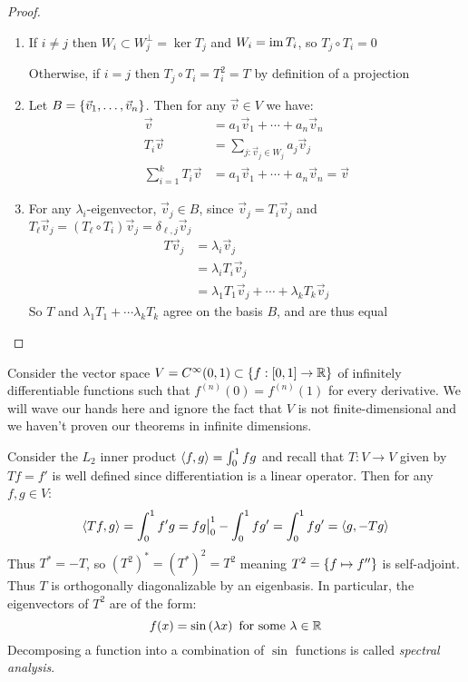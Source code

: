 \begin{proof}
\begin{enumerate}[(1)]
    \item If $i \ne j$ then $W_i \subset W_j^\perp = \ker T_j$ and $W_i = \operatorname{im} T_i$, so $T_j \circ T_i = 0$

      Otherwise, if $i = j$ then $T_j \circ T_i = T_i^2 = T$ by definition of a projection

    \item Let $B = \left\{\vec v_1, \ldots, \vec v_n\right\}$. Then for any $\vec v \in V$ we have:
      \begin{align}
        \vec v &= a_1\vec v_1 + \cdots + a_n\vec v_n \\
        T_i \vec v &= \sum_{j : \vec v_j \in W_j} a_j\vec v_j \\
        \sum_{i=1}^k T_i \vec v &= a_1 \vec v_1 + \cdots + a_n \vec v_n = \vec v
      \end{align}

    \item For any $\lambda_i$-eigenvector, $\vec v_j \in B$, since $\vec v_j = T_i\vec v_j$ and $T_\ell \vec v_j = (T_\ell \circ T_i) \vec v_j = \delta_{\ell,j}\vec v_j$
      \begin{align}
        T\vec v_j &= \lambda_i\vec v_j \\
          &= \lambda_iT_i\vec v_j \\
          &= \lambda_1T_1 \vec v_j + \cdots + \lambda_k T_k \vec v_j
      \end{align}
      So $T$ and $\lambda_1T_1 + \cdots \lambda_kT_k$ agree on the basis $B$, and are thus equal
  \end{enumerate}
\end{proof}

\begin{remark}
  Consider the vector space $V = C^\infty(0,1) \subset \left\{ f : [0,1] \to \mathbb{R} \right\}$
  of infinitely differentiable functions such that $f^{(n)}(0) = f^{(n)}(1)$ for every derivative.
  We will wave our hands here and ignore the fact that $V$ is not finite-dimensional and we haven't proven our theorems in infinite dimensions.

  Consider the $L_2$ inner product $\left\langle f , g \right\rangle = \int_0^1fg$ and recall that $T : V \to V$ given by $T f = f'$ is well defined since differentiation is a linear operator.
  Then for any $f, g \in V$:
    $$\left\langle Tf , g \right\rangle = \int_0^1f'g = fg\big\rvert_0^1 - \int_0^1fg' = \int_0^1fg' = \left\langle g , -Tg \right\rangle$$
  Thus $T^* = -T$, so $(T^2)^* = (T^*)^2 = T^2$ meaning $T^2 = \left\{ f \mapsto f'' \right\}$ is self-adjoint.
  Thus $T$ is orthogonally diagonalizable by an eigenbasis. In particular, the eigenvectors of $T^2$ are of the form:
    $$f(x) = \sin \left(\lambda x\right) \text{ for some } \lambda \in \mathbb{R}$$
  Decomposing a function into a combination of $\sin$ functions is called \emph{spectral analysis}.
\end{remark}

